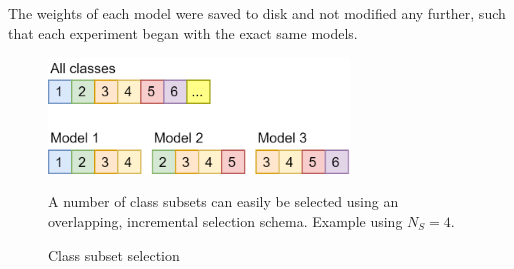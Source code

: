 \documentclass{report}
\begin{document}
	The weights of each model were saved to disk and not modified any further, such that each experiment began with the exact same models. \par
	\begin{figure}[h]
		\centering
		\includegraphics[width=8cm]{modelsubsets}
		\caption{Class subset selection}
		A number of class subsets can easily be selected using an overlapping, incremental selection schema. Example using $N_S = 4$.
		\label{fig:subsets:1}
	\end{figure}
\end{document}
